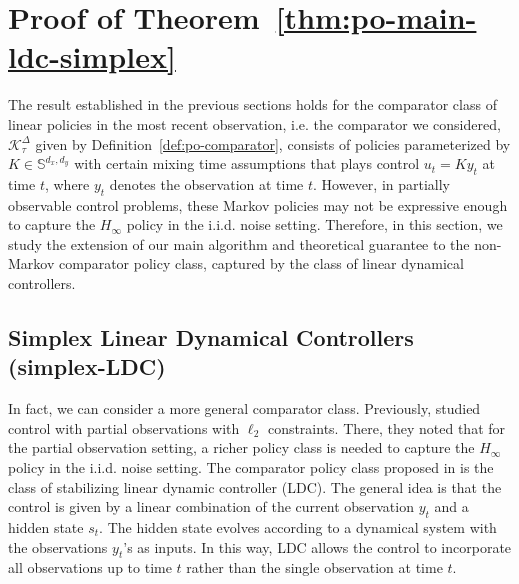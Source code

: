 \newpage


\section{Proof of Theorem~\ref{thm:po-main-ldc-simplex}}

\iffalse

The result established in the previous sections holds for the comparator class of linear policies in the most recent observation, i.e. the comparator we considered, $\mathcal{K}_{\tau}^{\Delta}$ given by Definition~\ref{def:po-comparator}, consists of policies parameterized by $K\in\mathbb{S}^{d_x,d_y}$ with certain mixing time assumptions that plays control $u_t=Ky_t$ at time $t$, where $y_t$ denotes the observation at time $t$. 
However, in partially observable control problems, these Markov policies may not be expressive enough to capture the $H_{\infty}$ policy in the i.i.d. noise setting. Therefore, in this section, we study the extension of our main algorithm and theoretical guarantee to the non-Markov comparator policy class, captured by the class of linear dynamical controllers.

\subsection{Simplex Linear Dynamical Controllers (simplex-LDC)}
\label{sec:simplex-ldc}

In fact, we can consider a more general comparator class.  Previously, \cite{simchowitz2020improper} studied control with partial observations with $\ell_2$ constraints. There, they noted that for the partial observation setting, a richer policy class is needed to capture the $H_{\infty}$ policy in the i.i.d. noise setting. The comparator policy class proposed in \citep{simchowitz2020improper} is the class of stabilizing linear dynamic controller (LDC). The general idea is that the control is given by a linear combination of the current observation $y_t$ and a hidden state $s_t$. The hidden state evolves according to a dynamical system with the observations $y_t$'s as inputs. In this way, LDC allows the control to incorporate all observations up to time $t$ rather than the single observation at time $t$.

